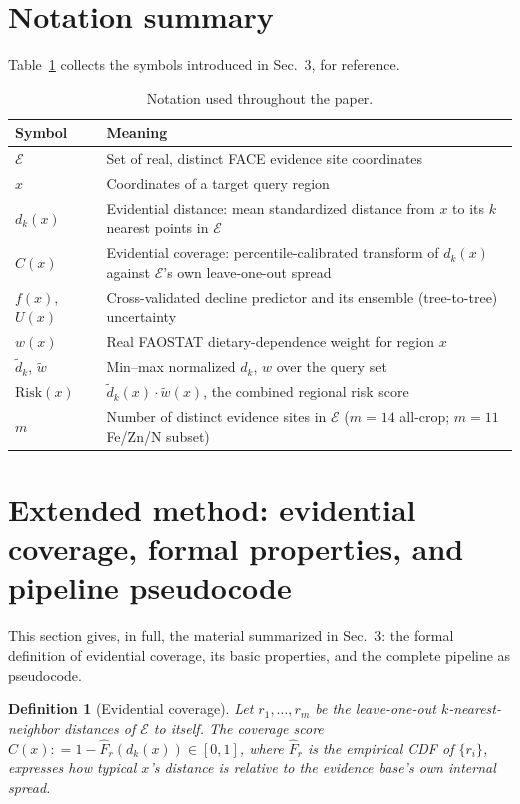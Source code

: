 \documentclass{article}
\newtheorem{definition}{Definition}
\newcommand{\eqdef}{\mathrel{\mathop:}=}
\begin{document}
\section{Notation summary}
\label{app:notation}
Table~\ref{tab:notation} collects the symbols introduced in Sec.~3, for reference.

\begin{table}[h]
\centering
\small
\caption{Notation used throughout the paper.}
\label{tab:notation}
\begin{tabular}{p{}p{}}
\toprule
\textbf{Symbol} & \textbf{Meaning} \\
\midrule
$\mathcal{E}$ & Set of real, distinct FACE evidence site coordinates \\
$x$ & Coordinates of a target query region \\
$d_k(x)$ & Evidential distance: mean standardized distance from $x$ to its $k$ nearest points in $\mathcal{E}$ \\
$C(x)$ & Evidential coverage: percentile-calibrated transform of $d_k(x)$ against $\mathcal{E}$'s own leave-one-out spread \\
$f(x)$, $U(x)$ & Cross-validated decline predictor and its ensemble (tree-to-tree) uncertainty \\
$w(x)$ & Real FAOSTAT dietary-dependence weight for region $x$ \\
$\widetilde{d}_k$, $\widetilde{w}$ & Min--max normalized $d_k$, $w$ over the query set \\
$\mathrm{Risk}(x)$ & $\widetilde{d}_k(x) \cdot \widetilde{w}(x)$, the combined regional risk score \\
$m$ & Number of distinct evidence sites in $\mathcal{E}$ ($m=14$ all-crop; $m=11$ Fe/Zn/N subset) \\
\bottomrule
\end{tabular}
\end{table}

\section{Extended method: evidential coverage, formal properties, and pipeline pseudocode}
\label{app:extended-method}
This section gives, in full, the material summarized in Sec.~3: the formal definition of evidential coverage, its basic properties, and the complete pipeline as pseudocode.

\begin{definition}[Evidential coverage]
Let $r_1, \ldots, r_m$ be the leave-one-out $k$-nearest-neighbor distances of $\mathcal{E}$ to itself. The coverage score $C(x) \eqdef 1 - \widehat{F}_r(d_k(x)) \in [0,1]$, where $\widehat{F}_r$ is the empirical CDF of $\{r_i\}$, expresses how typical $x$'s distance is relative to the evidence base's own internal spread.
\end{definition}
\end{document}
